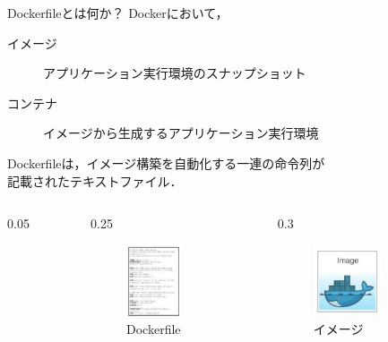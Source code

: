\begin{frame}{Dockerfileとは何か？}
    Dockerにおいて，
    \begin{description}
        \item[イメージ] アプリケーション実行環境のスナップショット
        \item[コンテナ] イメージから生成するアプリケーション実行環境
    \end{description}

    Dockerfileは，イメージ構築を自動化する一連の命令列が\\記載されたテキストファイル．

    \begin{columns}[totalwidth=\mytotalwidth]
        \begin{column}[T]{0.05\mycolumnwidth}
        \end{column}
        \begin{column}[T]{0.25\mycolumnwidth}
            \begin{figure}
                \centering
                \includegraphics[height=60pt]{img/_dockerfile.png}
                \caption{Dockerfile}
            \end{figure}
        \end{column}
        \begin{column}[T]{0.3\mycolumnwidth}
            \begin{figure}
                \centering
                \includegraphics[height=60pt]{img/_image.png}
                \caption{イメージ}
            \end{figure}
        \end{column}
\end{columns}
\end{frame}
